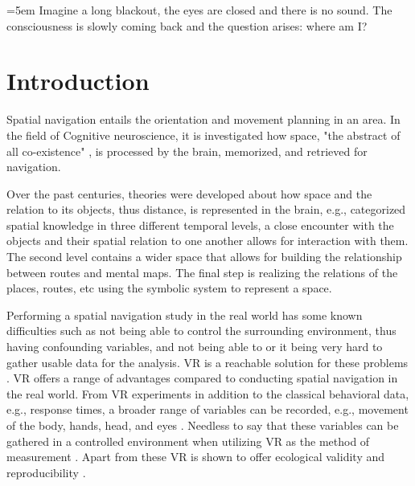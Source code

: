 \markboth{}{}

\begin{minipage}[l]{80mm}
	\vspace{120pt} 
	\leftskip=5em
	Imagine a long blackout, the eyes are closed and there is no sound. The consciousness is slowly coming back and the question arises: where am I?\\
\end{minipage}


\vspace{20pt}


\chapter{Introduction}


Spatial navigation entails the orientation and movement planning in an area. In the field of Cognitive neuroscience, it is investigated how space, "the abstract of all co-existence" \autocite{spencer1989}, is processed by the brain, memorized, and retrieved for navigation. 

Over the past centuries, theories were developed about how space and the relation to its objects, thus distance, is represented in the brain, e.g., \textcite{cassirer1955philosophy} categorized spatial knowledge in three different temporal levels, a close encounter with the objects and their spatial relation to one another allows for interaction with them. The second level contains a wider space that allows for building the relationship between routes and mental maps. The final step is realizing the relations of the places, routes, etc using the symbolic system to represent a space. 

Performing a spatial navigation study in the real world has some known difficulties such as not being able to control the surrounding environment, thus having confounding variables, and not being able to or it being very hard to gather usable data for the analysis. VR is a reachable solution for these problems \autocite{diersch2019potential}. VR offers a range of advantages compared to conducting spatial navigation in the real world. From VR experiments in addition to the classical behavioral data, e.g., response times, a broader range of variables can be recorded, e.g., movement of the body, hands, head, and eyes \autocite{pan2018and}. Needless to say that these variables can be gathered in a controlled environment when utilizing VR as the method of measurement \autocite{mcilvenny2020future}. Apart from these VR is shown to offer ecological validity \autocite{pan2018and, chicchi2017novel} and reproducibility \autocite{pan2018and}.

